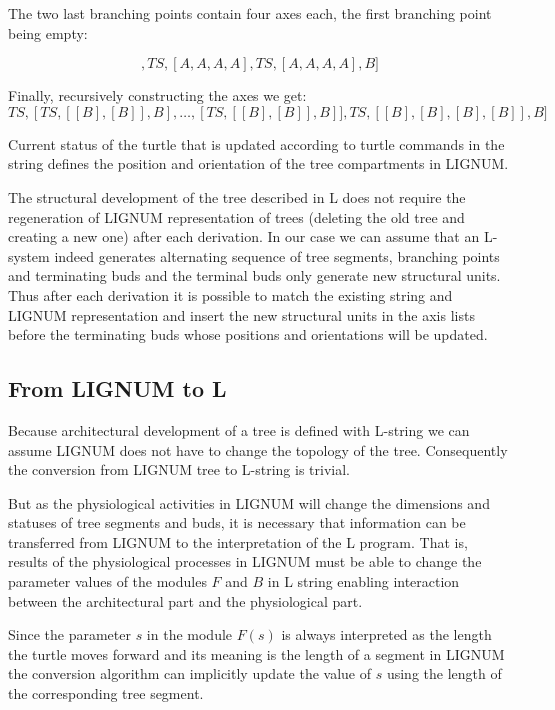 The  two  last branching  points  contain  four  axes each,  the  first
branching point being empty:

\begin{equation}
[TS, [], TS, [A,A,A,A], TS, [A,A,A,A], B]
\end{equation}

Finally, recursively constructing the axes we get:
\begin{equation}
[TS, [] TS,[TS,[[B],[B]],B],\ldots, [TS,[[B],[B]],B]], TS, [[B],[B],[B],[B]], B]
\end{equation}

Current  status of  the turtle  that  is updated  according to  turtle
commands in  the string  defines the position  and orientation  of the
tree compartments in LIGNUM.

The structural development of the tree described in L does not require
the regeneration  of LIGNUM representation of trees  (deleting the old
tree and  creating a new one)  after each derivation.  In  our case we
can assume  that an L-system indeed generates  alternating sequence of
tree segments, branching points  and terminating buds and the terminal
buds only  generate new structural units.  Thus  after each derivation
it is possible to match  the existing string and LIGNUM representation
and  insert the  new structural  units in  the axis  lists  before the
terminating buds whose positions and orientations will be updated.


\subsection{From LIGNUM to L}\label{LignumToL}

Because architectural  development of a tree is  defined with L-string
we can assume LIGNUM does not have to change the topology of the tree.
Consequently the conversion from LIGNUM tree to L-string is trivial.
  
But  as the  physiological activities  in  LIGNUM \citep{perttunen:96}
will change the dimensions and  statuses of tree segments and buds, it
is necessary  that information can  be transferred from LIGNUM  to the
interpretation   of  the   L program.    That  is,   results  of   the
physiological processes in LIGNUM must be able to change the parameter
values of  the modules  $F$ and $B$  in L string  enabling interaction
between the architectural part and the physiological part.

Since the parameter $s$ in  the module $F(s)$ is always interpreted as
the length the turtle moves forward and its meaning is the length of a
segment in  LIGNUM the conversion algorithm can  implicitly update the
value of $s$ using the length of the corresponding tree segment.

